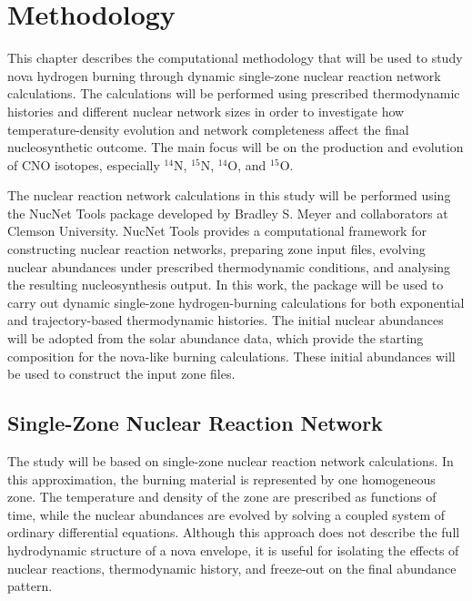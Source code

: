 
\chapter{Methodology} %
\label{Chapter2}

This chapter describes the computational methodology that will be used to study nova hydrogen burning through dynamic single-zone nuclear reaction network calculations. The calculations will be performed using prescribed thermodynamic histories and different nuclear network sizes in order to investigate how temperature-density evolution and network completeness affect the final nucleosynthetic outcome. The main focus will be on the production and evolution of CNO isotopes, especially $^{14}\mathrm{N}$, $^{15}\mathrm{N}$, $^{14}\mathrm{O}$, and $^{15}\mathrm{O}$.

The nuclear reaction network calculations in this study will be performed using the NucNet Tools package developed by Bradley S. Meyer and collaborators at Clemson University. NucNet Tools provides a computational framework for constructing nuclear reaction networks, preparing zone input files, evolving nuclear abundances under prescribed thermodynamic conditions, and analysing the resulting nucleosynthesis output. In this work, the package will be used to carry out dynamic single-zone hydrogen-burning calculations for both exponential and trajectory-based thermodynamic histories. The initial nuclear abundances will be adopted from the \cite{bergemann2025chemical} solar abundance data, which provide the starting composition for the nova-like burning calculations. These initial abundances will be used to construct the input zone files.

\section{Single-Zone Nuclear Reaction Network}

The study will be based on single-zone nuclear reaction network calculations. In this approximation, the burning material is represented by one homogeneous zone. The temperature and density of the zone are prescribed as functions of time, while the nuclear abundances are evolved by solving a coupled system of ordinary differential equations. Although this approach does not describe the full hydrodynamic structure of a nova envelope, it is useful for isolating the effects of nuclear reactions, thermodynamic history, and freeze-out on the final abundance pattern.

